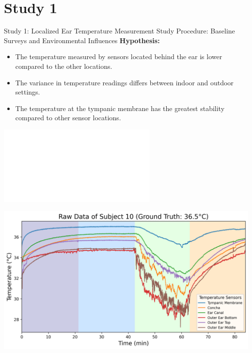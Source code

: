 \documentclass[en]{sdqbeamer}
\begin{document}
\section{Study 1}
\begin{frame}{Study 1: Localized Ear Temperature Measurement Study Procedure: Baseline Surveys and Environmental Influences}
\textbf{Hypothesis:}
\begin{overprint}
    \begin{itemize}
        \item<1-> The temperature measured by sensors located behind the ear is lower compared to the other locations.
        \item<2-> The variance in temperature readings differs between indoor and outdoor settings.
        \item<3-> The temperature at the tympanic membrane has the greatest stability compared to other sensor locations.
    \end{itemize}
    \end{overprint}
    
    \begin{center}
        \includegraphics<1->[width=0.85\linewidth]{../thesis-doc/images/study1/Procedure_short.pdf} %
    \end{center}
\end{frame}

\begin{frame}
    \begin{center}
        \includegraphics[width=0.9\linewidth]{../thesis-doc/images/study1/Logging_person_10_0smoothed_raw_data.png} %
    \end{center}
\end{frame}
\end{document}
